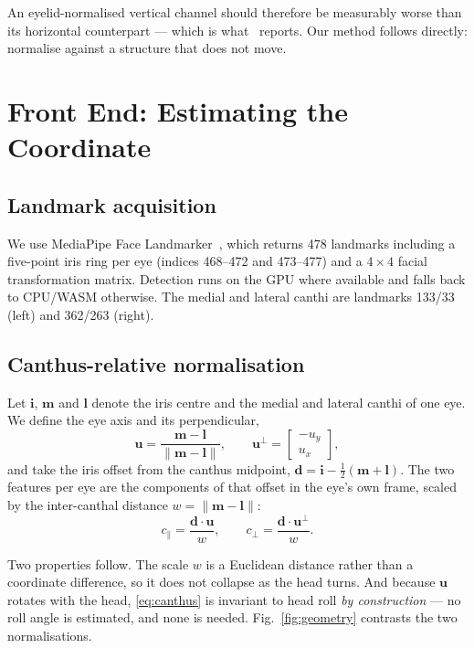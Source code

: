 \documentclass[conference]{IEEEtran}
\begin{document}
An eyelid-normalised vertical channel should therefore be measurably worse than
its horizontal counterpart --- which is what~\cite{ref01} reports. Our method
follows directly: normalise against a structure that does not move.

\section{Front End: Estimating the Coordinate}
\label{sec:frontend}

\subsection{Landmark acquisition}

We use MediaPipe Face Landmarker~\cite{ref10}, which returns 478 landmarks including a
five-point iris ring per eye (indices 468--472 and 473--477) and a
$4\times4$ facial transformation matrix. Detection runs on the GPU where
available and falls back to CPU/WASM otherwise. The medial and lateral canthi
are landmarks 133/33 (left) and 362/263 (right).

\subsection{Canthus-relative normalisation}

Let $\mathbf{i}$, $\mathbf{m}$ and $\mathbf{l}$ denote the iris centre and the
medial and lateral canthi of one eye. We define the eye axis and its
perpendicular,
\begin{equation}
\mathbf{u} = \frac{\mathbf{m} - \mathbf{l}}{\lVert \mathbf{m} - \mathbf{l}\rVert},
\qquad
\mathbf{u}^{\perp} = \begin{bmatrix} -u_y \\ u_x \end{bmatrix},
\end{equation}
and take the iris offset from the canthus midpoint,
$\mathbf{d} = \mathbf{i} - \tfrac{1}{2}(\mathbf{m} + \mathbf{l})$. The two
features per eye are the components of that offset in the eye's own frame,
scaled by the inter-canthal distance $w = \lVert \mathbf{m} - \mathbf{l}\rVert$:
\begin{equation}
c_{\parallel} = \frac{\mathbf{d}\cdot\mathbf{u}}{w},
\qquad
c_{\perp} = \frac{\mathbf{d}\cdot\mathbf{u}^{\perp}}{w}.
\label{eq:canthus}
\end{equation}

Two properties follow. The scale $w$ is a Euclidean distance rather than a
coordinate difference, so it does not collapse as the head turns. And because
$\mathbf{u}$ rotates with the head, \eqref{eq:canthus} is invariant to head roll
\emph{by construction} --- no roll angle is estimated, and none is needed.
Fig.~\ref{fig:geometry} contrasts the two normalisations.
\end{document}
